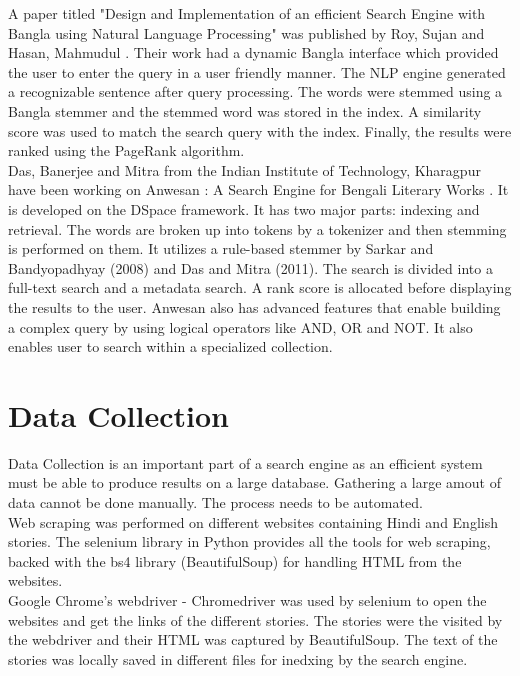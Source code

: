 \documentclass[12pt]{article}
\begin{document}
	A paper titled "Design and Implementation of an efficient Search Engine with Bangla using Natural Language Processing" was published by Roy, Sujan and Hasan, Mahmudul \cite{saitama}. Their work had a dynamic Bangla interface which provided the user to enter the query in a user friendly manner. The NLP engine generated a recognizable sentence after query processing. The words were stemmed using a Bangla stemmer and the stemmed word was stored in the index. A similarity score was used to match the search query with the index. Finally, the results were ranked using the PageRank algorithm.\\
	
	Das, Banerjee and Mitra from the Indian Institute of Technology, Kharagpur have been working on Anwesan : A Search Engine for Bengali Literary Works \cite{anwesan}. It is developed on the DSpace framework. It has two major parts: indexing and retrieval. The words are broken up into tokens by a tokenizer and then stemming is performed on them. It utilizes a rule-based stemmer by Sarkar and Bandyopadhyay (2008) and Das and Mitra (2011). The search is divided into a full-text search and a metadata search. A rank score is allocated before displaying the results to the user. Anwesan also has advanced features that enable building a complex query by using logical operators like AND, OR and NOT. It also enables user to search within a specialized collection.
	
	\pagebreak
	
	\section{Data Collection}
	
	Data Collection is an important part of a search engine as an efficient system must be able to produce results on a large database. Gathering a large amout of data cannot be done manually. The process needs to be automated.\\
	
	Web scraping was performed on different websites containing Hindi and English stories. The selenium library in Python provides all the tools for web scraping, backed with the bs4 library (BeautifulSoup) for handling HTML from the websites.\\
	
	Google Chrome's webdriver - Chromedriver was used by selenium to open the websites and get the links of the different stories. The stories were the visited by the webdriver and their HTML was captured by BeautifulSoup. The text of the stories was locally saved in different files for inedxing by the search engine. 
	
\end{document}
